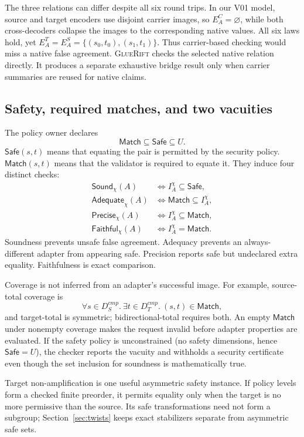 \documentclass[sigconf,anonymous,review]{acmart}
\newcommand{\sys}{\textsc{GlueRift}\xspace}
\newcommand{\safe}{\mathsf{Safe}}
\newcommand{\matchrel}{\mathsf{Match}}
\newcommand{\sound}{\mathsf{Sound}}
\newcommand{\adequate}{\mathsf{Adequate}}
\newcommand{\precise}{\mathsf{Precise}}
\newcommand{\faithful}{\mathsf{Faithful}}
\begin{document}
The three relations can differ despite all six round trips.  In our
V01 model, source and target encoders use disjoint carrier images, so
$E_A^C=\varnothing$, while both cross-decoders collapse the images to
the corresponding native values.  All six laws hold, yet
$E_A^T=E_A^S=\{(s_0,t_0),(s_1,t_1)\}$.  Thus carrier-based checking
would miss a native false agreement.  \sys checks the selected native
relation directly.  It produces a separate exhaustive bridge result
only when carrier summaries are reused for native claims.

\subsection{Safety, required matches, and two vacuities}

The policy owner declares
\[
\matchrel\subseteq\safe\subseteq U.
\]
$\safe(s,t)$ means that equating the pair is permitted by the security
policy.  $\matchrel(s,t)$ means that the validator is required to
equate it.  They induce four distinct checks:
\begin{align*}
\sound_\chi(A) &\iff I_A^\chi\subseteq\safe,\\
\adequate_\chi(A) &\iff \matchrel\subseteq I_A^\chi,\\
\precise_\chi(A) &\iff I_A^\chi\subseteq\matchrel,\\
\faithful_\chi(A) &\iff I_A^\chi=\matchrel.
\end{align*}
Soundness prevents unsafe false agreement.  Adequacy prevents an
always-different adapter from appearing safe.  Precision reports safe
but undeclared extra equality.  Faithfulness is exact comparison.

Coverage is not inferred from an adapter's successful image.  For
example, source-total coverage is
\[
\forall s\in D_S^{cmp}.\ \exists t\in D_T^{cmp}.\ (s,t)\in\matchrel,
\]
and target-total is symmetric; bidirectional-total requires both.
An empty $\matchrel$ under nonempty coverage makes the request invalid
before adapter properties are evaluated.  If the safety policy is
unconstrained (no safety dimensions, hence $\safe=U$), the checker
reports the vacuity and withholds a security certificate even though
the set inclusion for soundness is mathematically true.

Target non-amplification is one useful asymmetric safety instance.  If
policy levels form a checked finite preorder, it permits equality only
when the target is no more permissive than the source.  Its safe
transformations need not form a subgroup; Section~\ref{sec:twists}
keeps exact stabilizers separate from asymmetric safe sets.
\end{document}
